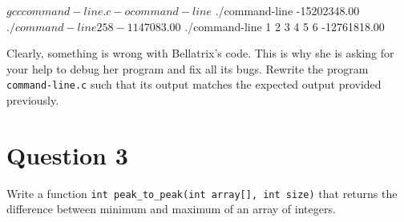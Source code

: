 \documentclass[12pt,letterpaper,twoside]{article}
\begin{document}
\begin{terminal}
$ gcc command-line.c -o command-line
$ ./command-line
-15202348.00
$ ./command-line 2 5 8
-1147083.00
$ ./command-line 1 2 3 4 5 6
-12761818.00
\end{terminal}

Clearly, something is wrong with Bellatrix's code.
This is why she is asking for your help to debug her program and fix all its bugs.
Rewrite the program \texttt{command-line.c} such that its output matches the expected output provided previously.

\section*{Question 3}

Write a function \texttt{int peak\_to\_peak(int array[], int size)} that returns the difference between minimum and maximum of an array of integers.
\end{document}
